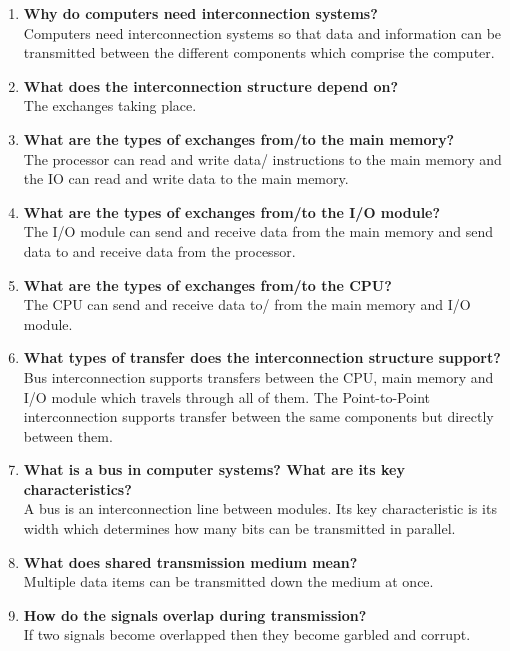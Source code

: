 
\begin{enumerate}
    \item \textbf{Why do computers need interconnection systems?}\\
    Computers need interconnection systems so that data and information can be transmitted between the different components which comprise the computer.
    \item \textbf{What does the interconnection structure depend on?}\\
    The exchanges taking place.
    \item \textbf{What are the types of exchanges from/to the main memory?}\\
    The processor can read and write data/ instructions to the main memory and the IO can read and write data to the main memory.
    \item \textbf{What are the types of exchanges from/to the I/O module?}\\
    The I/O module can send and receive data from the main memory and send data to and receive data from the processor.
    \item \textbf{What are the types of exchanges from/to the CPU?}\\
    The CPU can send and receive data to/ from the main memory and I/O module.
    \item \textbf{What types of transfer does the interconnection structure support? }\\
    Bus interconnection supports transfers between the CPU, main memory and I/O module which travels through all of them. The Point-to-Point interconnection supports transfer between the same components but directly between them.
    \item \textbf{What is a bus in computer systems? What are its key characteristics?}\\
    A bus is an interconnection line between modules. Its key characteristic is its width which determines how many bits can be transmitted in parallel.
    \item \textbf{What does shared transmission medium mean?}\\
    Multiple data items can be transmitted down the medium at once.
    \item \textbf{How do the signals overlap during transmission?}\\
    If two signals become overlapped then they become garbled and corrupt.

\end{enumerate}
